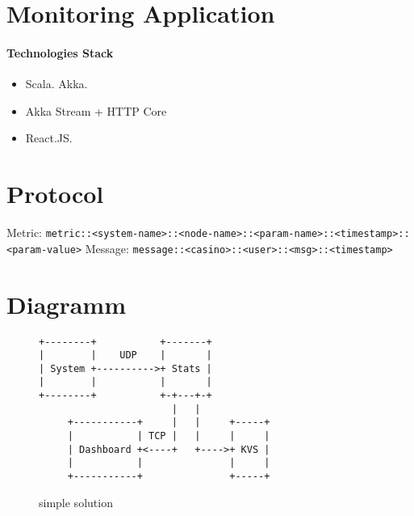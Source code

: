 \section{Monitoring Application}

\paragraph{Technologies Stack}

\begin{itemize}
    \item Scala. Akka.
    \item Akka Stream + HTTP Core
    \item React.JS.
\end{itemize}

\section*{Protocol}

Metric: 
  \verb|metric::<system-name>::<node-name>::<param-name>::<timestamp>::<param-value>|
Message:
  \verb|message::<casino>::<user>::<msg>::<timestamp>|

\section*{Diagramm}

\begin{figure}
\begin{verbatim}
+--------+           +-------+          
|        |    UDP    |       |          
| System +---------->+ Stats |          
|        |           |       |          
+--------+           +-+---+-+          
                       |   |            
     +-----------+     |   |     +-----+
     |           | TCP |   |     |     |
     | Dashboard +<----+   +---->+ KVS |
     |           |               |     |
     +-----------+               +-----+
\end{verbatim}
\caption{simple solution}
\label{fig:ascii-box}
\end{figure}
